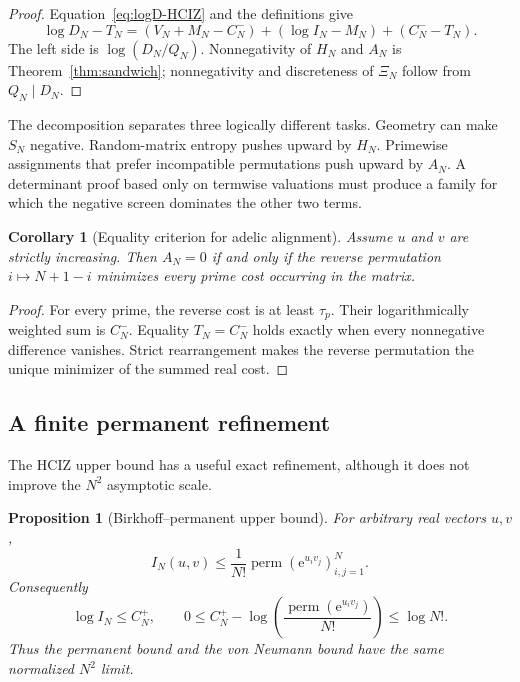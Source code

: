 \documentclass[11pt]{article}
\newcommand{\e}{\mathrm e}
\newcommand{\1}{\mathbf 1}
\theoremstyle{plain}
\newtheorem{proposition}[theorem]{Proposition}
\newtheorem{corollary}[theorem]{Corollary}
\theoremstyle{definition}
\theoremstyle{remark}
\begin{document}
\begin{proof}
Equation~\eqref{eq:logD-HCIZ} and the definitions give
\[
 \log D_N-T_N
 =(V_N+M_N-C_N^-)+(\log I_N-M_N)+(C_N^--T_N).
\]
The left side is $\log(D_N/Q_N)$.  Nonnegativity of $H_N$ and $A_N$ is
Theorem~\ref{thm:sandwich}; nonnegativity and discreteness of $\Xi_N$ follow
from $Q_N\mid D_N$.
\end{proof}

The decomposition separates three logically different tasks.  Geometry can
make $S_N$ negative.  Random-matrix entropy pushes upward by $H_N$.
Primewise assignments that prefer incompatible permutations push upward by
$A_N$.  A determinant proof based only on termwise valuations must produce a
family for which the negative screen dominates the other two terms.

\begin{corollary}[Equality criterion for adelic alignment]\label{cor:alignment-equality}
Assume $u$ and $v$ are strictly increasing.  Then $A_N=0$ if and only if the
reverse permutation $i\mapsto N+1-i$ minimizes every prime cost occurring in
the matrix.
\end{corollary}

\begin{proof}
For every prime, the reverse cost is at least $\tau_p$.  Their logarithmically
weighted sum is $C_N^-$.  Equality $T_N=C_N^-$ holds exactly when every
nonnegative difference vanishes.  Strict rearrangement makes the reverse
permutation the unique minimizer of the summed real cost.
\end{proof}

\subsection{A finite permanent refinement}

The HCIZ upper bound has a useful exact refinement, although it does not
improve the $N^2$ asymptotic scale.

\begin{proposition}[Birkhoff--permanent upper bound]\label{prop:permanent}
For arbitrary real vectors $u,v$,
\begin{equation}\label{eq:permanent-upper}
 I_N(u,v)\le \frac1{N!}\operatorname{perm}(\e^{u_iv_j})_{i,j=1}^N.
\end{equation}
Consequently
\[
 \log I_N\le C_N^+,
 \qquad
 0\le C_N^+-\log\!\left(\frac{\operatorname{perm}(\e^{u_iv_j})}{N!}\right)
 \le\log N!.
\]
Thus the permanent bound and the von Neumann bound have the same normalized
$N^2$ limit.
\end{proposition}
\end{document}
